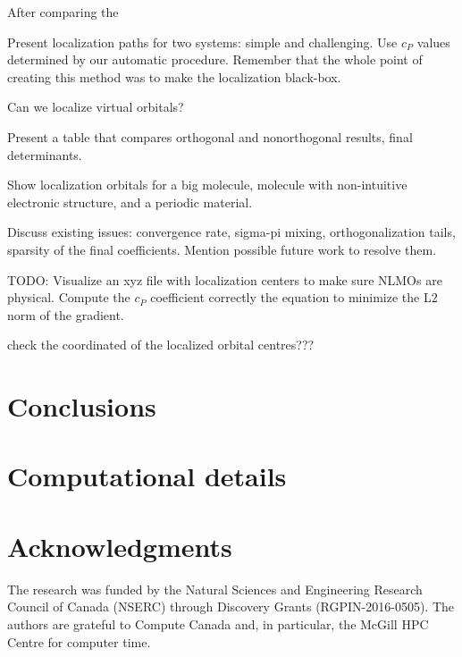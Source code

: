 \documentclass[aps,prl,reprint,amsmath,amssymb]{revtex4-1}
\begin{document}

After comparing the 

Present localization paths for two systems: simple and challenging. Use $c_P$ values determined by our automatic procedure. Remember that the whole point of creating this method was to make the localization black-box.

Can we localize virtual orbitals?

Present a table that compares orthogonal and nonorthogonal results, final determinants.

Show localization orbitals for a big molecule, molecule with non-intuitive electronic structure, and a periodic material.

Discuss existing issues: convergence rate, sigma-pi mixing, orthogonalization tails, sparsity of the final coefficients. Mention possible future work to resolve them.

TODO: Visualize an xyz file with localization centers to make sure NLMOs are physical. Compute the $c_P$ coefficient correctly the equation to minimize the L2 norm of the gradient.

check the coordinated of the localized orbital centres???

\section{Conclusions}


\section{Computational details}


\section{Acknowledgments} 

The research was funded by the Natural Sciences and Engineering Research Council of Canada (NSERC) through Discovery
Grants (RGPIN-2016-0505). The authors are grateful to Compute Canada and, in particular, the McGill HPC Centre for computer time.



\end{document}
